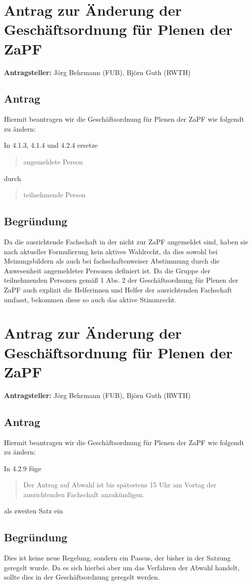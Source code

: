 \documentclass[draft,10pt,oneside]{scrartcl}
\begin{document}
\section*{Antrag zur Änderung der Geschäftsordnung für Plenen der ZaPF}

\textbf{Antragsteller:} Jörg Behrmann (FUB), Björn Guth (RWTH)

\subsection*{Antrag}

Hiermit beantragen wir die Geschäftsordnung für Plenen der ZaPF wie folgendt zu
ändern:

In 4.1.3, 4.1.4 und 4.2.4 ersetze
\begin{quote}
	angemeldete Person
\end{quote}
durch
\begin{quote}
	teilnehmende Person
\end{quote}

\subsection*{Begründung}
Da die ausrichtende Fachschaft in der nicht zur ZaPF angemeldet sind, haben sie
nach aktueller Formulierung kein aktives Wahlrecht, da dies sowohl bei
Meinungsbildern als auch bei fachschaftenweiser Abstimmung durch die
Anwesenheit angemeldeter Personen definiert ist. Da die Gruppe der
teilnehmenden Personen gemäß 1 Abs. 2 der Geschäftsordnung für Plenen der ZaPF
auch explizit die Helferinnen und Helfer der ausrichtenden Fachschaft umfasst,
bekommen diese so auch das aktive Stimmrecht.

\newpage

\section*{Antrag zur Änderung der Geschäftsordnung für Plenen der ZaPF}

\textbf{Antragsteller:} Jörg Behrmann (FUB), Björn Guth (RWTH)

\subsection*{Antrag}

Hiermit beantragen wir die Geschäftsordnung für Plenen der ZaPF wie folgendt zu
ändern:

In 4.2.9 füge
\begin{quote}
	Der Antrag auf Abwahl ist bis spätestens 15 Uhr am Vortag der ausrichtenden
	Fachschaft anzukündigen.
\end{quote}
als zweiten Satz ein

\subsection*{Begründung}
Dies ist keine neue Regelung, sondern ein Passus, der bisher in der Satzung
geregelt wurde. Da es sich hierbei aber um das Verfahren der Abwahl handelt,
sollte dies in der Geschäftsordnung geregelt werden.
\end{document}
